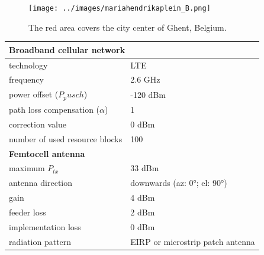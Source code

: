 \begin{figure}
  \begin{center}
    \texttt{[image: ../images/mariahendrikaplein\_B.png]}
  \end{center}
 \caption{The red area covers the city center of Ghent, Belgium.}
  \label{fig:ghent}
\end{figure}

\begin{table}[!htb]
\centering
\begin{tabular}[t]{ll}
        \toprule
        \multicolumn{2}{l}{\textbf{Broadband cellular network}} \\
        \hline
        \hspace{3mm}  technology                          & LTE     \\
        \hspace{3mm}  frequency                           & 2.6 GHz \\
        \hspace{3mm}  power offset ($P_pusch$)            & -120 dBm  \\
        \hspace{3mm}  path loss compensation ($\alpha$)   & 1  \\
        \hspace{3mm}  correction value                    & 0 dBm  \\
        \hspace{3mm}  number of used resource blocks      & 100  \\
        \hline
        \multicolumn{2}{l}{\textbf{Femtocell antenna}} \\
        \hline  
        \hspace{3mm}  maximum $P_{tx}$                    & 33 dBm   \\
        \hspace{3mm}  antenna  direction                  & downwards (az: \ang{0}; el: \ang{90})    \\ 
        \hspace{3mm}  gain                                & 4 dBm   \\ 
        \hspace{3mm}  feeder loss                         & 2 dBm   \\ 
        \hspace{3mm}  implementation loss                 & 0 dBm   \\
        \hspace{3mm}  radiation pattern                   & \acs{EIRP} or microstrip patch antenna\\

\end{tabular}
\end{table}
